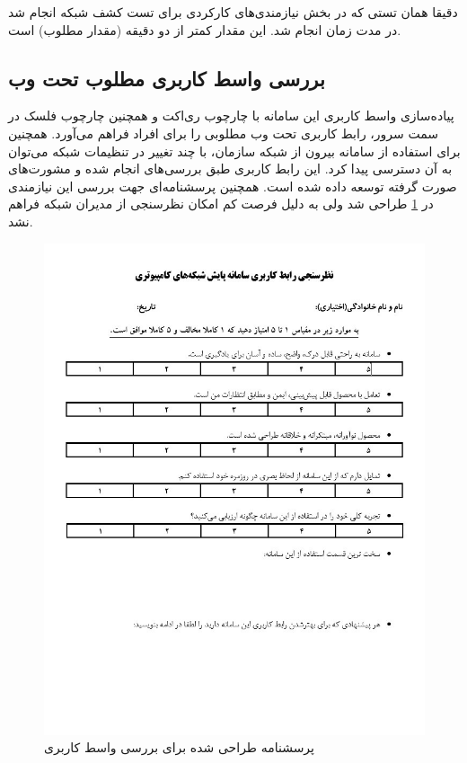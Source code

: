 دقیقا همان تستی که در بخش نیازمندی‌های کارکردی برای تست کشف شبکه انجام شد در مدت زمان  انجام شد. این مقدار کمتر از دو دقیقه (مقدار مطلوب) است.

\subsection{بررسی واسط کاربری مطلوب تحت وب}

پیاده‌سازی واسط کاربری این سامانه با چارچوب ری‌اکت و همچنین چارچوب فلسک در سمت سرور، رابط کاربری تحت وب مطلوبی را برای افراد فراهم می‌آورد. همچنین برای استفاده از سامانه بیرون از شبکه سازمان، با چند تغییر در تنظیمات شبکه می‌توان به آن دسترسی پیدا کرد. این رابط کاربری طبق بررسی‌های انجام شده و مشورت‌های صورت گرفته توسعه داده شده است. همچنین پرسشنامه‌ای جهت بررسی این نیازمندی در \cref{fig.57} طراحی شد ولی به دلیل فرصت کم امکان نظرسنجی از مدیران شبکه فراهم نشد.

\begin{figure}[!h]
    \centering\includegraphics[scale=.90]{./survey}
    \caption{پرسشنامه طراحی شده برای بررسی واسط کاربری}\label{fig.57}
\end{figure}

